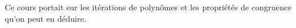 Ce cours portait sur les itérations de polynômes et les propriétés de congruence qu'on peut en déduire.